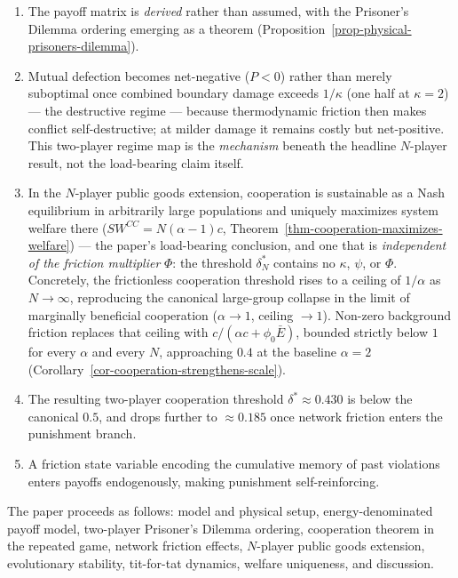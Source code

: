 \documentclass[11pt]{article}
\theoremstyle{plain}
\theoremstyle{definition}
\theoremstyle{remark}
\providecommand{\tightlist}{%
  \setlength{\itemsep}{0pt}\setlength{\parskip}{0pt}}
\begin{document}
\begin{enumerate}
\def\labelenumi{\arabic{enumi}.}
\tightlist
\item
  The payoff matrix is \emph{derived} rather than assumed, with the
  Prisoner's Dilemma ordering emerging as a theorem
  (Proposition~\ref{prop-physical-prisoners-dilemma}).
\item
  Mutual defection becomes net-negative (\(P < 0\)) rather than merely
  suboptimal once combined boundary damage exceeds \(1/\kappa\) (one
  half at \(\kappa = 2\)) --- the destructive regime --- because
  thermodynamic friction then makes conflict self-destructive; at milder
  damage it remains costly but net-positive. This two-player regime map
  is the \emph{mechanism} beneath the headline \(N\)-player result, not
  the load-bearing claim itself.
\item
  In the \(N\)-player public goods extension, cooperation is sustainable
  as a Nash equilibrium in arbitrarily large populations and uniquely
  maximizes system welfare there (\(SW^{CC} = N(\alpha-1)c\),
  Theorem~\ref{thm-cooperation-maximizes-welfare}) --- the paper's
  load-bearing conclusion, and one that is \emph{independent of the
  friction multiplier} \(\Phi\): the threshold \(\delta_N^*\) contains
  no \(\kappa\), \(\psi\), or \(\Phi\). Concretely, the frictionless
  cooperation threshold rises to a ceiling of \(1/\alpha\) as
  \(N \to \infty\), reproducing the canonical large-group collapse in
  the limit of marginally beneficial cooperation (\(\alpha \to 1\),
  ceiling \(\to 1\)). Non-zero background friction replaces that ceiling
  with \(c/(\alpha c + \phi_0 \bar{E})\), bounded strictly below \(1\)
  for every \(\alpha\) and every \(N\), approaching \(0.4\) at the
  baseline \(\alpha = 2\)
  (Corollary~\ref{cor-cooperation-strengthens-scale}).
\item
  The resulting two-player cooperation threshold
  \(\delta^* \approx 0.430\) is below the canonical \(0.5\), and drops
  further to \(\approx 0.185\) once network friction enters the
  punishment branch.
\item
  A friction state variable encoding the cumulative memory of past
  violations enters payoffs endogenously, making punishment
  self-reinforcing.
\end{enumerate}

The paper proceeds as follows: model and physical setup,
energy-denominated payoff model, two-player Prisoner's Dilemma ordering,
cooperation theorem in the repeated game, network friction effects,
\(N\)-player public goods extension, evolutionary stability, tit-for-tat
dynamics, welfare uniqueness, and discussion.
\end{document}
